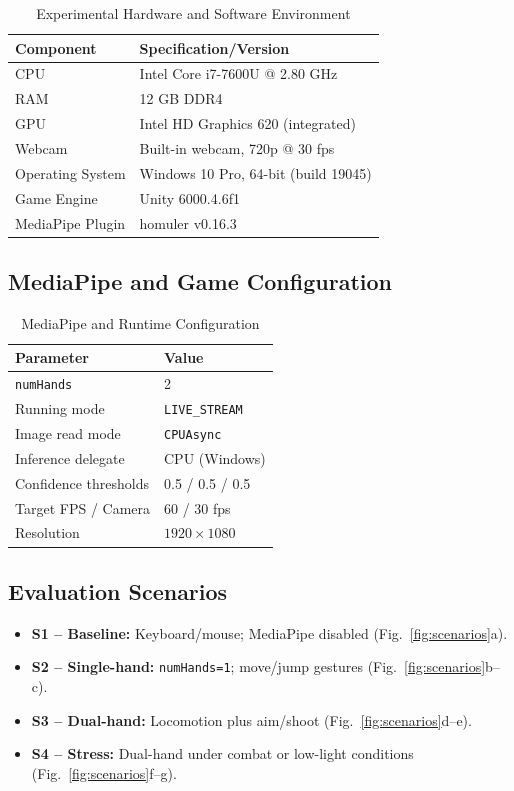 \documentclass[journal,onecolumn,12pt,draftclsnofoot]{IEEEtran}
\begin{document}
\begin{itemize}
\begin{table}[htbp]
\caption{Experimental Hardware and Software Environment}
\centering
\begin{tabular}{|l|l|}
\hline
\textbf{Component} & \textbf{Specification/Version} \\
\hline
CPU & Intel Core i7-7600U @ 2.80 GHz \\
RAM & 12 GB DDR4 \\
GPU & Intel HD Graphics 620 (integrated) \\
Webcam & Built-in webcam, 720p @ 30 fps \\
Operating System & Windows 10 Pro, 64-bit (build 19045) \\
Game Engine & Unity 6000.4.6f1 \\
MediaPipe Plugin & homuler v0.16.3 \\
\hline
\end{tabular}
\label{tab:hardware}
\end{table}

\subsection{MediaPipe and Game Configuration}
\begin{table}[htbp]
\caption{MediaPipe and Runtime Configuration}
\centering
\begin{tabular}{|l|l|}
\hline
\textbf{Parameter} & \textbf{Value} \\
\hline
\texttt{numHands} & 2 \\
Running mode & \texttt{LIVE\_STREAM} \\
Image read mode & \texttt{CPUAsync} \\
Inference delegate & CPU (Windows) \\
Confidence thresholds & 0.5 / 0.5 / 0.5 \\
Target FPS / Camera & 60 / 30 fps \\
Resolution & $1920\times1080$ \\
\hline
\end{tabular}
\label{tab:config}
\end{table}

\subsection{Evaluation Scenarios}
\begin{itemize}
\item \textbf{S1 -- Baseline:} Keyboard/mouse; MediaPipe disabled (Fig.~\ref{fig:scenarios}a).
\item \textbf{S2 -- Single-hand:} \texttt{numHands=1}; move/jump gestures (Fig.~\ref{fig:scenarios}b--c).
\item \textbf{S3 -- Dual-hand:} Locomotion plus aim/shoot (Fig.~\ref{fig:scenarios}d--e).
\item \textbf{S4 -- Stress:} Dual-hand under combat or low-light conditions (Fig.~\ref{fig:scenarios}f--g).
\end{itemize}


\end{itemize}
\end{document}
